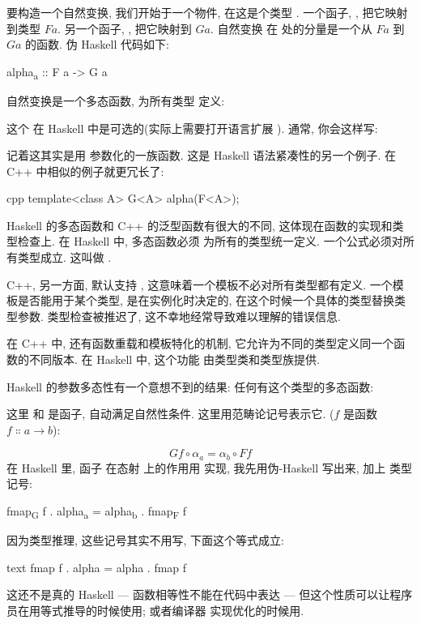 要构造一个自然变换, 我们开始于一个物件, 在这是个类型 . 一个函子, , 把它映射到类型 $F a$.
另一个函子, , 把它映射到 $G a$. 自然变换  在  处的分量是一个从 $F a$ 到 $G a$
的函数. 伪 Haskell 代码如下:

\begin{snipv}
alpha\textsubscript{a} :: F a -> G a
\end{snipv}
自然变换是一个多态函数, 为所有类型  定义:

这个  在 Haskell 中是可选的(实际上需要打开语言扩展 ). 通常, 你会这样写:

记着这其实是用  参数化的一族函数. 这是 Haskell 语法紧凑性的另一个例子. 在 C++ 中相似的例子就更冗长了:

\begin{snip}{cpp}
template<class A> G<A> alpha(F<A>);
\end{snip}
Haskell 的多态函数和 C++ 的泛型函数有很大的不同, 这体现在函数的实现和类型检查上. 在 Haskell 中, 多态函数必须
为所有的类型统一定义. 一个公式必须对所有类型成立. 这叫做 .

C++, 另一方面, 默认支持 , 这意味着一个模板不必对所有类型都有定义.
一个模板是否能用于某个类型, 是在实例化时决定的, 在这个时候一个具体的类型替换类型参数. 类型检查被推迟了,
这不幸地经常导致难以理解的错误信息.

在 C++ 中, 还有函数重载和模板特化的机制, 它允许为不同的类型定义同一个函数的不同版本. 在 Haskell 中, 这个功能
由类型类和类型族提供.

Haskell 的参数多态性有一个意想不到的结果: 任何有这个类型的多态函数:

这里  和  是函子, 自动满足自然性条件. 这里用范畴论记号表示它. ($f$
是函数 $f \Colon a \to b$):

\[G f \circ \alpha_a = \alpha_b \circ F f\]
在 Haskell 里, 函子  在态射  上的作用用  实现, 我先用伪-Haskell 写出来, 加上
类型记号:

\begin{snipv}
fmap\textsubscript{G} f . alpha\textsubscript{a} = alpha\textsubscript{b} . fmap\textsubscript{F} f
\end{snipv}
因为类型推理, 这些记号其实不用写, 下面这个等式成立:

\begin{snip}{text}
fmap f . alpha = alpha . fmap f
\end{snip}
这还不是真的 Haskell --- 函数相等性不能在代码中表达 --- 但这个性质可以让程序员在用等式推导的时候使用; 或者编译器
实现优化的时候用.

